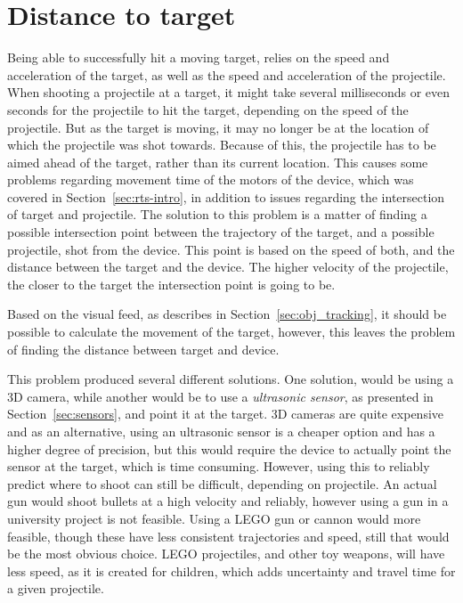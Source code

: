 \section{Distance to target}
Being able to successfully hit a moving target, relies on the speed and acceleration of the target, as well as the speed and acceleration of the projectile.
When shooting a projectile at a target, it might take several milliseconds or even seconds for the projectile to hit the target, depending on the speed of the projectile.
But as the target is moving, it may no longer be at the location of which the projectile was shot towards.
Because of this, the projectile has to be aimed ahead of the target, rather than its current location.
This causes some problems regarding movement time of the motors of the device, which was covered in Section~\ref{sec:rts-intro}, in addition to issues regarding the intersection of target and projectile.
The solution to this problem is a matter of finding a possible intersection point between the trajectory of the target, and a possible projectile, shot from the device. 
This point is based on the speed of both, and the distance between the target and the device. 
The higher velocity of the projectile, the closer to the target the intersection point is going to be.

Based on the visual feed, as describes in Section~\ref{sec:obj_tracking}, it should be possible to calculate the movement of the target, however, this leaves the problem of finding the distance between target and device.

This problem produced several different solutions.
One solution, would be using a 3D camera, while another would be to use a \textit{ultrasonic sensor}, as presented in Section~\ref{sec:sensors}, and point it at the target.
3D cameras are quite expensive and as an alternative, using an ultrasonic sensor is a cheaper option and has a higher degree of precision, but this would require the device to actually point the sensor at the target, which is time consuming\cite{sensorsaccuracy}.
However, using this to reliably predict where to shoot can still be difficult, depending on projectile.
An actual gun would shoot bullets at a high velocity and reliably, however using a gun in a university project is not feasible.
Using a LEGO gun or cannon would more feasible, though these have less consistent trajectories and speed, still that would be the most obvious choice.
LEGO projectiles, and other toy weapons, will have less speed, as it is created for children, which adds uncertainty and travel time for a given projectile.

